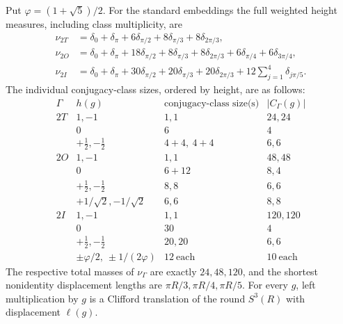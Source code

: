 \documentclass[11pt]{article}
\begin{document}
\begin{theorem}
\label{p1b:thm:v14-class-geodesic-atlas}
Put $\varphi=(1+\sqrt5)/2$. For the standard embeddings the full weighted
height measures, including class multiplicity, are
\begin{align}
\label{p1b:eq:v14-class-height}
 \nu_{2T}&=\delta_0+\delta_\pi+6\delta_{\pi/2}
                      +8\delta_{\pi/3}+8\delta_{2\pi/3},\\
 \nu_{2O}&=\delta_0+\delta_\pi+18\delta_{\pi/2}
                      +8\delta_{\pi/3}+8\delta_{2\pi/3}
                      +6\delta_{\pi/4}+6\delta_{3\pi/4},\\
 \nu_{2I}&=\delta_0+\delta_\pi+30\delta_{\pi/2}
                      +20\delta_{\pi/3}+20\delta_{2\pi/3}
                      +12\sum_{j=1}^{4}\delta_{j\pi/5}.
\end{align}
The individual conjugacy-class sizes, ordered by height, are as follows:
\[
\begin{array}{c|c|c|c}
 \Gamma & h(g)&\text{conjugacy-class size(s)}&|C_\Gamma(g)|\\\hline
 2T &1,-1&1,1&24,24\\
    &0&6&4\\
    &+\tfrac12,-\tfrac12&4+4,\ 4+4&6,6\\\hline
 2O &1,-1&1,1&48,48\\
    &0&6+12&8,4\\
    &+\tfrac12,-\tfrac12&8,8&6,6\\
    &+1/\sqrt2,-1/\sqrt2&6,6&8,8\\\hline
 2I &1,-1&1,1&120,120\\
    &0&30&4\\
    &+\tfrac12,-\tfrac12&20,20&6,6\\
    &\pm\varphi/2,\ \pm1/(2\varphi)&12\ \text{each}&10\ \text{each}
\end{array}
\]
The respective total masses of $\nu_\Gamma$ are exactly $24,48,120$, and
the shortest nonidentity displacement lengths are
$\pi R/3,\pi R/4,\pi R/5$. For every $g$, left multiplication by $g$
is a Clifford translation of the round $S^3(R)$ with displacement $\ell(g)$.
\end{theorem}
\end{document}
